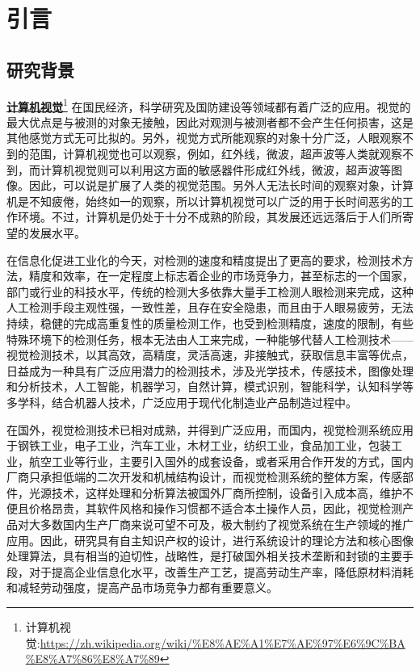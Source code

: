 \chapter{引言}\label{chap:introduction}

\section{研究背景}
{\href{https://zh.wikipedia.org/wiki/\%E8\%AE\%A1\%E7\%AE\%97\%E6\%9C\%BA\%E8\%A7\%86\%E8\%A7\%89}{\textbf{计算机视觉}}\footnote{计算机视觉:\url{https://zh.wikipedia.org/wiki/\%E8\%AE\%A1\%E7\%AE\%97\%E6\%9C\%BA\%E8\%A7\%86\%E8\%A7\%89}}
在国民经济，科学研究及国防建设等领域都有着广泛的应用。视觉的最大优点是与被测的对象无接触，因此对观测与被测者都不会产生任何损害，这是其他感觉方式无可比拟的。另外，视觉方式所能观察的对象十分广泛，人眼观察不到的范围，计算机视觉也可以观察，例如，红外线，微波，超声波等人类就观察不到，而计算机视觉则可以利用这方面的敏感器件形成红外线，微波，超声波等图像。因此，可以说是扩展了人类的视觉范围。另外人无法长时间的观察对象，计算机是不知疲倦，始终如一的观察，所以计算机视觉可以广泛的用于长时间恶劣的工作环境。不过，计算机是仍处于十分不成熟的阶段，其发展还远远落后于人们所寄望的发展水平。

在信息化促进工业化的今天，对检测的速度和精度提出了更高的要求，检测技术方法，精度和效率，在一定程度上标志着企业的市场竞争力，甚至标志的一个国家，部门或行业的科技水平，传统的检测大多依靠大量手工检测人眼检测来完成，这种人工检测手段主观性强，一致性差，且存在安全隐患，而且由于人眼易疲劳，无法持续，稳健的完成高重复性的质量检测工作，也受到检测精度，速度的限制，有些特殊环境下的检测任务，根本无法由人工来完成，一种能够代替人工检测技术——视觉检测技术，以其高效，高精度，灵活高速，非接触式，获取信息丰富等优点，日益成为一种具有广泛应用潜力的检测技术，涉及光学技术，传感技术，图像处理和分析技术，人工智能，机器学习，自然计算，模式识别，智能科学，认知科学等多学科，结合机器人\citep{.2014,.2015b}技术，广泛应用于现代化制造业产品制造过程中。

在国外，视觉检测技术已相对成熟，并得到广泛应用，而国内，视觉检测系统应用于钢铁工业，电子工业，汽车工业\citep{.2006}，木材工业，纺织工业，食品加工业，包装工业，航空工业等行业，主要引入国外的成套设备，或者采用合作开发的方式，国内厂商只承担低端的二次开发和机械结构设计，而视觉检测系统的整体方案，传感部件，光源技术，这样处理和分析算法被国外厂商所控制，设备引入成本高，维护不便且价格昂贵，其软件风格和操作习惯都不适合本土操作人员，因此，视觉检测产品对大多数国内生产厂商来说可望不可及，极大制约了视觉系统在生产领域的推广应用。因此，研究具有自主知识产权的设计，进行系统设计的理论方法和核心图像处理算法，具有相当的迫切性，战略性，是打破国外相关技术垄断和封锁的主要手段，对于提高企业信息化水平，改善生产工艺，提高劳动生产率，降低原材料消耗和减轻劳动强度，提高产品市场竞争力都有重要意义。

}
